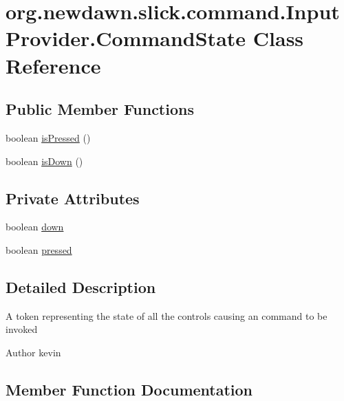 \hypertarget{classorg_1_1newdawn_1_1slick_1_1command_1_1_input_provider_1_1_command_state}{}\section{org.\+newdawn.\+slick.\+command.\+Input\+Provider.\+Command\+State Class Reference}
\label{classorg_1_1newdawn_1_1slick_1_1command_1_1_input_provider_1_1_command_state}
\subsection*{Public Member Functions}
\begin{DoxyCompactItemize}
\item 
boolean \mbox{\hyperlink{classorg_1_1newdawn_1_1slick_1_1command_1_1_input_provider_1_1_command_state_a8216987ce9b6ed4abf545af323b341bc}{is\+Pressed}} ()
\item 
boolean \mbox{\hyperlink{classorg_1_1newdawn_1_1slick_1_1command_1_1_input_provider_1_1_command_state_aa59f3f148709346d8722c652048fa2cc}{is\+Down}} ()
\end{DoxyCompactItemize}
\subsection*{Private Attributes}
\begin{DoxyCompactItemize}
\item 
boolean \mbox{\hyperlink{classorg_1_1newdawn_1_1slick_1_1command_1_1_input_provider_1_1_command_state_a8cfa0dcf27d3c3a5f389bebea44da4b4}{down}}
\item 
boolean \mbox{\hyperlink{classorg_1_1newdawn_1_1slick_1_1command_1_1_input_provider_1_1_command_state_a984ed679625be22d8159a28470d7bbd8}{pressed}}
\end{DoxyCompactItemize}


\subsection{Detailed Description}
A token representing the state of all the controls causing an command to be invoked

\begin{DoxyAuthor}{Author}
kevin 
\end{DoxyAuthor}


\subsection{Member Function Documentation}
\mbox{\label{classorg_1_1newdawn_1_1slick_1_1command_1_1_input_provider_1_1_command_state_aa59f3f148709346d8722c652048fa2cc}} 

